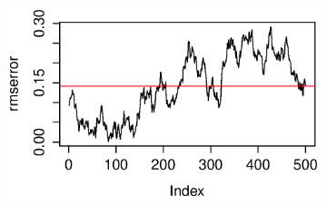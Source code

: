 \documentclass[a4paper,11pt]{article}
\begin{document}




\begin{figure}[H]
    \centering
    \begin{subfigure}[b]{0.4\textwidth}
            \includegraphics[width=\textwidth]{rmserror7.eps}
    \end{subfigure}
    

\end{figure}
\end{document}
